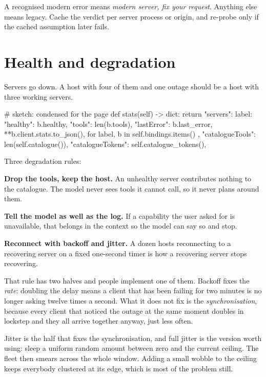 A recognised modern error means \emph{modern server, fix your request}. Anything
else means legacy. Cache the verdict per server process or origin, and re-probe
only if the cached assumption later fails.

\section{Health and degradation}

Servers go down. A host with four of them and one outage should be a host with
three working servers.

\begin{py}
# sketch: condensed for the page
def stats(self) -> dict:
    return {
        "servers": {
            label: {
                "healthy": b.healthy,
                "tools": len(b.tools),
                "lastError": b.last_error,
                **b.client.stats.to_json(),
            }
            for label, b in self.bindings.items()
        },
        "catalogueTools": len(self.catalogue()),
        "catalogueTokens": self.catalogue_tokens(),
    }
\end{py}

Three degradation rules:

\textbf{Drop the tools, keep the host.} An unhealthy server contributes nothing
to the catalogue. The model never sees tools it cannot call, so it never plans
around them.

\textbf{Tell the model as well as the log.} If a capability the user asked for
is
unavailable, that belongs in the context so the model can say so and stop.

\textbf{Reconnect with backoff and jitter.} A dozen hosts reconnecting to a
recovering server on a fixed one-second timer is how a recovering server stops
recovering.

That rule has two halves and people implement one of them. Backoff fixes the
\emph{rate}: doubling the delay means a client that has been failing for two
minutes is no longer asking twelve times a second. What it does not fix is the
\emph{synchronisation}, because every client that noticed the outage at the same
moment doubles in lockstep and they all arrive together anyway, just less often.

Jitter is the half that fixes the synchronisation, and full jitter is the
version worth using: sleep a uniform random amount between zero and the current ceiling. The fleet
then smears across the whole window. Adding a small wobble to the ceiling keeps
everybody clustered at its edge, which is most of the problem still.

